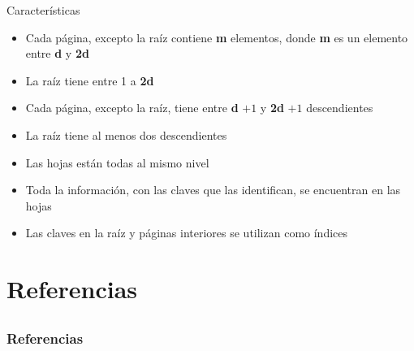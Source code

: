 \documentclass{beamer}
\begin{document}
\begin{frame}{Caracter\'isticas}
	\begin{itemize}
		\item Cada p\'agina, excepto la ra\'iz contiene \textbf{m} elementos, donde  \textbf{m} es un elemento entre \textbf{d} y \textbf{2d}
		\item La ra\'iz tiene entre 1 a \textbf{2d}
		\item Cada p\'agina, excepto la ra\'iz, tiene entre \textbf{d} $+ 1$ y \textbf{2d} $+ 1$ descendientes
		\item La ra\'iz tiene al menos dos descendientes
		\item Las hojas est\'an todas al mismo nivel
		\item Toda la informaci\'on, con las claves que las identifican, se encuentran en las hojas
		\item Las claves en la ra\'iz y p\'aginas interiores se utilizan como \'indices
	\end{itemize}
\end{frame}

\section{Referencias}
\subsection{}
\begin{frame}[allowframebreaks]
	\frametitle{Referencias}
	
	
\end{frame}
\end{document}
